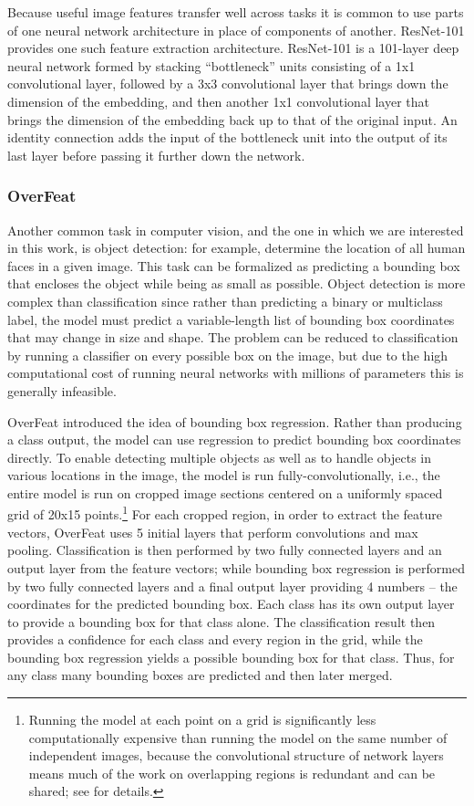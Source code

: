 \documentclass[sigconf]{acmart}
\begin{document}
Because useful image features transfer well across tasks it is common to use parts of one neural network architecture in place of components of another. 
ResNet-101 \cite{resnet} provides one such feature extraction architecture. ResNet-101 is a 101-layer deep neural network formed by stacking ``bottleneck'' units consisting of a 1x1 convolutional layer, followed by a 3x3 convolutional layer that brings down the dimension of the embedding, and then another 1x1 convolutional layer that brings the dimension of the embedding back up to that of the original input. An identity connection adds the input of the bottleneck unit into the output of its last layer before passing it further down the network.

\subsubsection{OverFeat} Another common task in computer vision, and the one in which we are interested in this work, is object detection: for example, determine the location of all human faces in a given image. 
This task can be formalized as predicting a bounding box that encloses the object while being as small as possible. 
Object detection is more complex than classification since rather than predicting a binary or multiclass label, the model must predict a variable-length list of bounding box coordinates that may change in size and shape. The problem can be reduced to classification by running a classifier on every possible box on the image, but due to the high computational cost of running neural networks with millions of parameters this is generally infeasible.

OverFeat \cite{overfeat} introduced the idea of bounding box regression. 
Rather than producing a class output, the model can use regression to predict bounding box coordinates directly. To enable detecting multiple objects as well as to handle objects in various locations in the image, the model is run fully-convolutionally, i.e., the entire model is run on cropped image sections centered on a uniformly spaced grid of 20x15 points.\footnote{Running the model at each point on a grid is significantly less computationally expensive than running the model on the same number of independent images, because the convolutional structure of network layers means much of the work on overlapping regions is redundant and can be shared; see \cite{overfeat} for details.}
For each cropped region, in order to extract the feature vectors, OverFeat uses 5 initial layers that perform convolutions and max pooling. Classification is then performed by two fully connected layers and an output layer from the feature vectors; while bounding box regression is performed by two fully connected layers and a final output layer providing 4 numbers -- the coordinates for the predicted bounding box. Each class has its own output layer to provide a bounding box for that class alone. The classification result then provides a confidence for each class and every region in the grid, while the bounding box regression yields a possible bounding box for that class. Thus, for any class many bounding boxes are predicted and then later merged.
\end{document}
